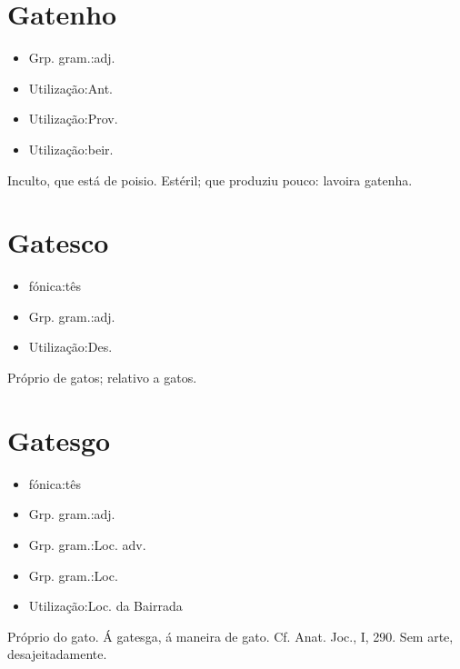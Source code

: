 \section{Gatenho}
\begin{itemize}
\item {Grp. gram.:adj.}
\end{itemize}
\begin{itemize}
\item {Utilização:Ant.}
\end{itemize}
\begin{itemize}
\item {Utilização:Prov.}
\end{itemize}
\begin{itemize}
\item {Utilização:beir.}
\end{itemize}
Inculto, que está de poisio.
Estéril; que produziu pouco: \textunderscore lavoira gatenha\textunderscore .
\section{Gatesco}
\begin{itemize}
\item {fónica:tês}
\end{itemize}
\begin{itemize}
\item {Grp. gram.:adj.}
\end{itemize}
\begin{itemize}
\item {Utilização:Des.}
\end{itemize}
Próprio de gatos; relativo a gatos.
\section{Gatesgo}
\begin{itemize}
\item {fónica:tês}
\end{itemize}
\begin{itemize}
\item {Grp. gram.:adj.}
\end{itemize}
\begin{itemize}
\item {Grp. gram.:Loc. adv.}
\end{itemize}
\begin{itemize}
\item {Grp. gram.:Loc.}
\end{itemize}
\begin{itemize}
\item {Utilização:Loc. da Bairrada}
\end{itemize}
Próprio do gato.
\textunderscore Á gatesga\textunderscore , á maneira de gato. Cf. \textunderscore Anat. Joc.\textunderscore , I, 290.
Sem arte, desajeitadamente.
